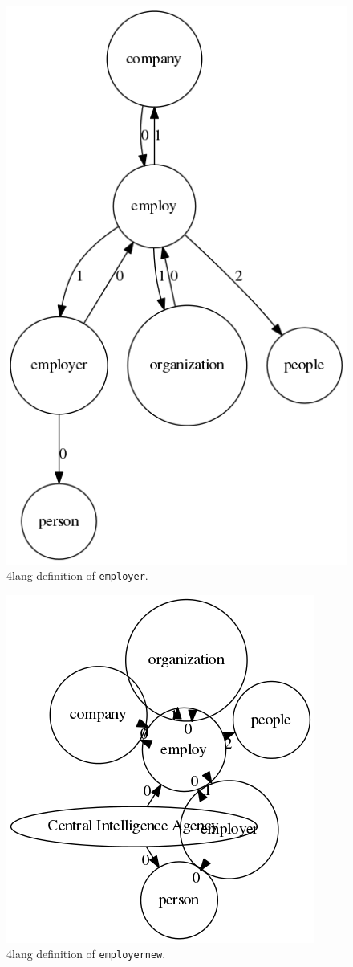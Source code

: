 \documentclass[10pt, a4paper]{article}
\begin{document}
\begin{figure}
\centering
    \includegraphics[scale=0.5]{employer.png}
\caption{4lang definition of \texttt{employer}.}
\label{fig:employer}
\end{figure}

\begin{figure}
\centering
    \includegraphics[scale=0.5]{employernew.png}
\caption{4lang definition of \texttt{employernew}.}
\label{fig:employernew}
\end{figure}
\end{document}
